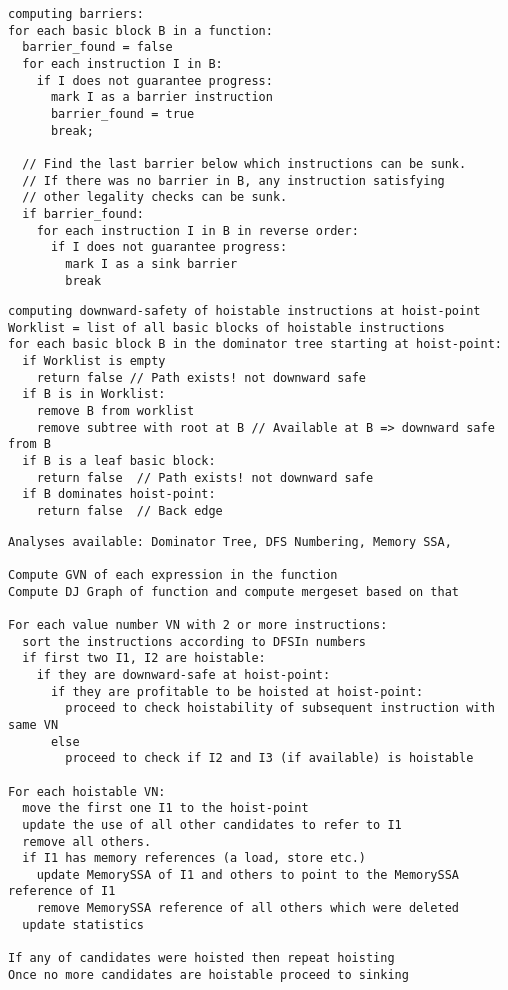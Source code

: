 \documentclass[acmlarge,review]{acmart}\settopmatter{printfolios=true}
\begin{document}
\begin{verbatim}
computing barriers:
for each basic block B in a function:
  barrier_found = false
  for each instruction I in B:
    if I does not guarantee progress:
      mark I as a barrier instruction
      barrier_found = true
      break;

  // Find the last barrier below which instructions can be sunk.
  // If there was no barrier in B, any instruction satisfying
  // other legality checks can be sunk.
  if barrier_found:
    for each instruction I in B in reverse order:
      if I does not guarantee progress:
        mark I as a sink barrier
        break
\end{verbatim}

\begin{verbatim}
computing downward-safety of hoistable instructions at hoist-point
Worklist = list of all basic blocks of hoistable instructions
for each basic block B in the dominator tree starting at hoist-point:
  if Worklist is empty
    return false // Path exists! not downward safe
  if B is in Worklist:
    remove B from worklist
    remove subtree with root at B // Available at B => downward safe from B
  if B is a leaf basic block:
    return false  // Path exists! not downward safe
  if B dominates hoist-point:
    return false  // Back edge

\end{verbatim}

\begin{verbatim}
Analyses available: Dominator Tree, DFS Numbering, Memory SSA,

Compute GVN of each expression in the function
Compute DJ Graph of function and compute mergeset based on that

For each value number VN with 2 or more instructions:
  sort the instructions according to DFSIn numbers
  if first two I1, I2 are hoistable:
    if they are downward-safe at hoist-point:
      if they are profitable to be hoisted at hoist-point:
        proceed to check hoistability of subsequent instruction with same VN
      else
        proceed to check if I2 and I3 (if available) is hoistable

For each hoistable VN:
  move the first one I1 to the hoist-point
  update the use of all other candidates to refer to I1
  remove all others.
  if I1 has memory references (a load, store etc.)
    update MemorySSA of I1 and others to point to the MemorySSA reference of I1
    remove MemorySSA reference of all others which were deleted
  update statistics

If any of candidates were hoisted then repeat hoisting
Once no more candidates are hoistable proceed to sinking
\end{verbatim}
\end{document}
